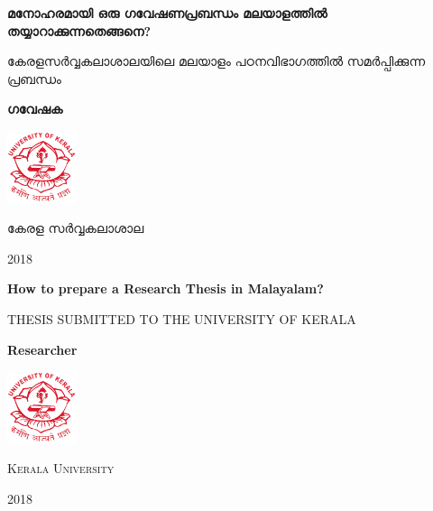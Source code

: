 \begin{titlepage}
	\centering
	{\huge\bfseries  മനോഹരമായി ഒരു ഗവേഷണപ്രബന്ധം  മലയാളത്തിൽ തയ്യാറാക്കുന്നതെങ്ങനെ? \par}
	
	\vspace{1cm}
	{\scshape\Large കേരളസർവ്വകലാശാലയിലെ മലയാളം പഠനവിഭാഗത്തിൽ സമർപ്പിക്കുന്ന പ്രബന്ധം \par}
	
		
	\vspace{2cm}
	{\Large\bfseries ഗവേഷക \par}
	\vfill
	\includegraphics[width=0.15\textwidth]{./contents/logo}\par\vspace{1cm}
	{\scshape\LARGE കേരള സർവ്വകലാശാല \par}

	{\large 2018 \par}
\end{titlepage}
 
\begin{titlepage}

	{\gentium
	\centering
	{\huge\bfseries  How to prepare a Research Thesis in Malayalam? \par}
	
	\vspace{1cm}
	{\scshape\Large THESIS SUBMITTED TO THE UNIVERSITY OF KERALA \par}
	
		
	\vspace{2cm}
	{\Large\bfseries Researcher \par}
	\vfill
	\includegraphics[width=0.15\textwidth]{./contents/logo}\par\vspace{1cm}
	{\scshape\LARGE Kerala University \par}
	
	{\large 2018 \par}
	}
\end{titlepage}